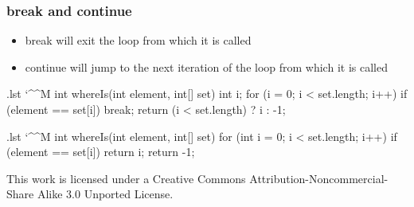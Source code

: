 \documentclass[10pt, handout]{beamer}
\makeatletter
\newenvironment{code}{%
  \begingroup
  \@bsphack
  \immediate\openout\lstvrb@out\jobname.lst
  \let\do\@makeother\dospecials\catcode`\^^M\active
  \def\verbatim@processline{%
    \immediate\write\lstvrb@out{\the\verbatim@line}}%
  \verbatim@start}{%
  \immediate\closeout\lstvrb@out
  \@esphack
  \endgroup

  \begin{alertblock}{}
    
  \end{alertblock}}
\makeatother
\begin{document}
\begin{frame}[fragile]
\frametitle{break and continue}
\begin{itemize}
   \item break will exit the loop from which it is called
   \item continue will jump to the next iteration of the loop from which it is called
\end{itemize}

\begin{code}
int whereIs(int element, int[] set) {
  int i;
  for (i = 0; i < set.length; i++) {
    if (element == set[i]) {
      break;
    }
  }
  return (i < set.length) ? i : -1;
}
\end{code}
\end{frame}

\begin{frame}[fragile]
\begin{code}
int whereIs(int element, int[] set) {
  for (int i = 0; i < set.length; i++) {
    if (element == set[i]) {
      return i;
    }
  }
  return -1;
}
\end{code}

\end{frame}

\begin{frame}
\begin{center}
  \tiny
  This work is licensed under a Creative Commons Attribution-Noncommercial-Share Alike 3.0 Unported License.
\end{center}
\end{frame}
\end{document}
